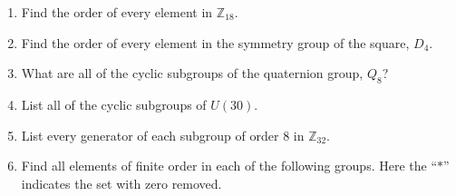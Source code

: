 {\begin{enumerate}
\begin{multicols}{3}
\begin{enumerate}
\item
$\displaystyle
\begin{pmatrix}
0 & 1/3 \\
3 & 0
\end{pmatrix}
$

\item
$\displaystyle
\begin{pmatrix}
1 & -1 \\
1 & 0
\end{pmatrix}
$

\item
$\displaystyle
\begin{pmatrix}
1 & -1 \\
0 & 1
\end{pmatrix}
$

\item
$\displaystyle
\begin{pmatrix}
1 & -1 \\
-1 & 0
\end{pmatrix}
$
 
\item
$\displaystyle
\begin{pmatrix}
\sqrt{3}/ 2 & 1/2 \\
-1/2 & \sqrt{3}/2
\end{pmatrix}
$

 \end{enumerate}
\end{multicols}

 

\item		  %
Find the order of every element in ${\mathbb Z}_{18}$.
 
 
\item
Find the order of every element in the symmetry group of the square,
$D_4$.
 
 
\item
What are all of the cyclic subgroups of the quaternion group, $Q_8$? 
 
 
\item
List all of the cyclic subgroups of $U(30)$.
 
 
\item
List every generator of each subgroup of order 8 in ${\mathbb
Z}_{32}$.
 
\item
Find all elements of finite order in each of the following groups. Here the ``$\ast$'' indicates the set with zero removed.
\begin{multicols}{3}
\begin{enumerate}
 

\end{enumerate}
\end{multicols}
\end{enumerate}}
